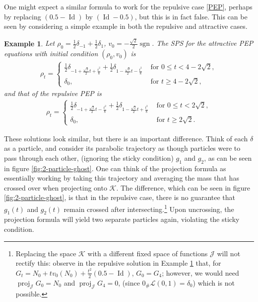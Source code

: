 \documentclass[11pt]{article}
\newtheorem{example}[theorem]{Example}
\numberwithin{equation}{section}
\DeclareMathOperator{\proj}{proj}
\DeclareMathOperator{\sgn}{sgn}
\DeclareMathOperator{\Id}{Id}
\begin{document}
        One might expect a similar formula to work for the repulsive case \eqref{PEP}, perhaps by replacing $(0.5-\Id)$ by $(\Id-0.5)$, but this is in fact false. This can be seen by considering a simple example in both the repulsive and attractive cases. 
        \begin{example}\label{attractive-repulsive-comparison}
            Let $\rho_0=\frac{1}{2}\delta_{-1}+\frac{1}{2}\delta_1$, $v_0=-\frac{\sqrt{2}}{2}\sgn$. The SPS for the attractive PEP equations with initial condition $(\rho_0,v_0)$ is 
            \begin{align*}
                \rho_t=\begin{cases}\frac{1}{2}\delta_{-1+\frac{\sqrt{2}}{2}t+\frac{t^2}{8}}+\frac{1}{2}\delta_{1-\frac{\sqrt{2}}{2}t-\frac{t^2}{8}} &\text{ for }0\leq t<4-2\sqrt{2}, 
                    \\
                    \delta_0, &\text{ for }t\geq4-2\sqrt{2},
                \end{cases}
            \end{align*}
            and that of the repulsive PEP is 
            \begin{align*}
                \rho_t=\begin{cases}\frac{1}{2}\delta_{-1+\frac{\sqrt{2}}{2}t-\frac{t^2}{8}}+\frac{1}{2}\delta_{1-\frac{\sqrt{2}}{2}t+\frac{t^2}{8}} &\text{ for }0\leq t<2\sqrt{2}, 
                    \\
                    \delta_0, &\text{ for }t\geq2\sqrt{2}.
                \end{cases}
            \end{align*}
        \end{example}
        These solutions look similar, but there is an important difference. Think of each $\delta$ as a particle, and consider its parabolic trajectory as though particles were to pass through each other, (ignoring the sticky condition) $g_1$ and $g_2$, as can be seen in figure \ref{fig:2-particle-ghost}. One can think of the projection formula as essentially working by taking this trajectory and averaging the mass that has crossed over when projecting onto $\mathcal{K}$. The difference, which can be seen in figure \ref{fig:2-particle-ghost}, is that in the repulsive case, there is no guarantee that $g_1(t)$ and $g_2(t)$ remain crossed after intersecting.\footnote{Replacing the space $\mathcal{K}$ with a different fixed space of functions $\mathcal{J}$ will not rectify this: observe in the repulsive solution in Example \ref{attractive-repulsive-comparison} that, for $G_t=N_0+tv_0(N_0)+\frac{t^2}{2}(0.5-\Id)$, $G_0=G_4$; however, we would need $\proj_\mathcal{J}G_0=N_0$ and $\proj_\mathcal{J}G_4=0$, (since $0_\#\mathcal{L}(0,1)=\delta_0$) which is not possible.} Upon uncrossing, the projection formula will yield two separate particles again, violating the sticky condition.
\end{document}
